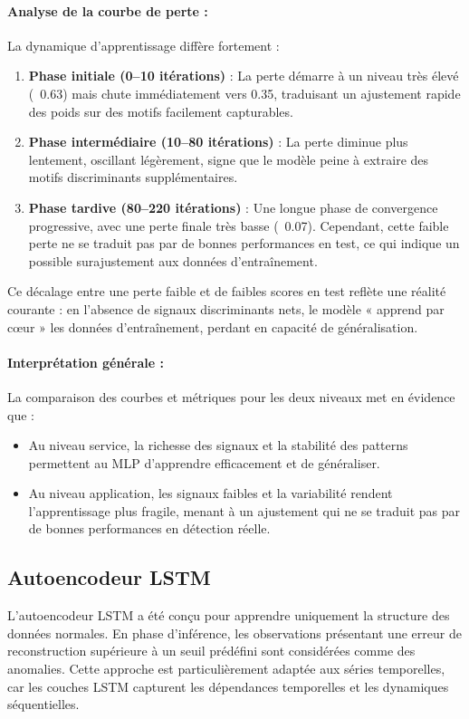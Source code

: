 \documentclass[a4paper,12pt]{report}
\begin{document}
\paragraph{Analyse de la courbe de perte :}
La dynamique d’apprentissage diffère fortement :
\begin{enumerate}
    \item \textbf{Phase initiale (0–10 itérations)} : La perte démarre à un niveau très élevé (~0.63) mais chute immédiatement vers 0.35, traduisant un ajustement rapide des poids sur des motifs facilement capturables.
    \item \textbf{Phase intermédiaire (10–80 itérations)} : La perte diminue plus lentement, oscillant légèrement, signe que le modèle peine à extraire des motifs discriminants supplémentaires.
    \item \textbf{Phase tardive (80–220 itérations)} : Une longue phase de convergence progressive, avec une perte finale très basse (~0.07). Cependant, cette faible perte ne se traduit pas par de bonnes performances en test, ce qui indique un possible surajustement aux données d’entraînement.
\end{enumerate}
Ce décalage entre une perte faible et de faibles scores en test reflète une réalité courante : en l’absence de signaux discriminants nets, le modèle « apprend par cœur » les données d’entraînement, perdant en capacité de généralisation.

\paragraph{Interprétation générale :}
La comparaison des courbes et métriques pour les deux niveaux met en évidence que :
\begin{itemize}
    \item Au niveau service, la richesse des signaux et la stabilité des patterns permettent au MLP d'apprendre efficacement et de généraliser.
    \item Au niveau application, les signaux faibles et la variabilité rendent l’apprentissage plus fragile, menant à un ajustement qui ne se traduit pas par de bonnes performances en détection réelle.
\end{itemize}


\subsection{Autoencodeur LSTM}

L’autoencodeur LSTM a été conçu pour apprendre uniquement la structure des données normales.  
En phase d’inférence, les observations présentant une erreur de reconstruction supérieure à un seuil prédéfini sont considérées comme des anomalies.  
Cette approche est particulièrement adaptée aux séries temporelles, car les couches LSTM capturent les dépendances temporelles et les dynamiques séquentielles.
\end{document}

